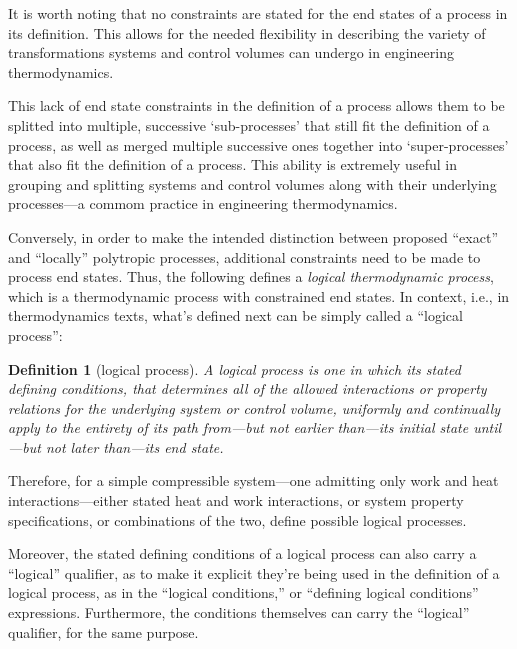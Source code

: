 \documentclass[fleqn,11pt]{SelfArx}
\newtheorem{definition}{Definition}
\begin{document}
    It is worth noting that no constraints are stated for the end states of  a  process  in  its
    definition.  This  allows  for  the  needed  flexibility  in  describing  the   variety   of
    transformations systems and control volumes can undergo in engineering thermodynamics.

    This lack of end state constraints in the definition of a process allows them to be splitted
    into multiple, successive `sub-processes' that still fit the definition  of  a  process,  as
    well as merged multiple successive ones together into `super-processes' that  also  fit  the
    definition of a process. This ability is extremely useful in grouping and splitting  systems
    and control volumes along with their underlying processes---a commom practice in engineering
    thermodynamics.

    Conversely, in order to  make  the  intended  distinction  between  proposed  ``exact''  and
    ``locally'' polytropic processes, additional constraints need to  be  made  to  process  end
    states. Thus, the following defines a  \emph{logical  thermodynamic  process},  which  is  a
    thermodynamic process with constrained end  states.  In  context,  i.e.,  in  thermodynamics
    texts, what's defined next can be simply called a ``logical process'':

    \begin{definition}[logical process]\label{def:logical.proc}
        A logical process is one in which its stated defining conditions, that determines all of
        the allowed interactions or property relations for  the  underlying  system  or  control
        volume, uniformly and continually apply to the  entirety  of  its  path  from---but  not
        earlier than---its initial state until---but not later than---its end state.
    \end{definition}

    Therefore,  for  a  simple  compressible  system---one  admitting   only   work   and   heat
    interactions---either stated heat and work interactions, or system property  specifications,
    or combinations of the two, define possible logical processes.

    Moreover, the stated defining conditions of a logical process can also carry  a  ``logical''
    qualifier, as to make it explicit they're being used in the definition of a logical process,
    as  in  the  ``logical  conditions,''  or  ``defining  logical   conditions''   expressions.
    Furthermore, the conditions themselves can carry the ``logical''  qualifier,  for  the  same
    purpose.
\end{document}
